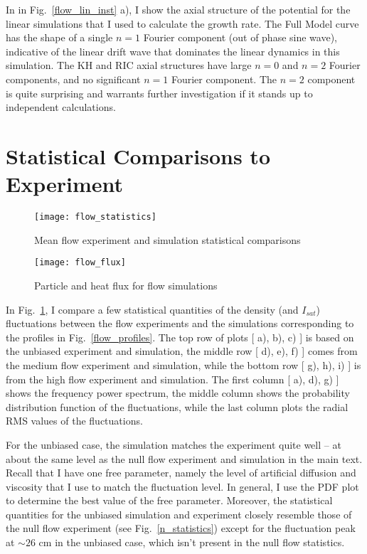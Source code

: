 In in Fig.~\ref{flow_lin_inst} a), I show the axial structure of the potential for the linear simulations that I used to calculate the growth rate. The Full Model curve has the shape of 
a single $n=1$ Fourier component (out of phase sine wave), indicative of the linear drift wave that dominates the linear dynamics in this simulation. The KH and RIC axial structures
have large $n=0$ and $n=2$ Fourier components, and no significant $n=1$ Fourier component. The $n=2$ component is quite surprising and warrants further investigation if it stands up to
independent calculations.

\section{Statistical Comparisons to Experiment}
\label{s_flow_stats}

\begin{figure}
\centerline{\texttt{[image: flow\_statistics]}}
\caption{Mean flow experiment and simulation statistical comparisons}
\label{flow_statistics}
\end{figure}

\begin{figure}
\centerline{\texttt{[image: flow\_flux]}}
\caption{Particle and heat flux for flow simulations}
\label{flow_flux}
\end{figure}

In Fig.~\ref{flow_statistics}, I compare a few statistical quantities of the density (and $I_{sat}$) fluctuations
between the flow experiments and the simulations corresponding to the profiles in Fig.~\ref{flow_profiles}. The top row
of plots [ a), b), c) ] is based on the unbiased experiment and simulation, the middle row [ d), e), f) ] comes from the medium flow experiment and simulation, 
while the bottom row [ g), h), i) ] is from the high flow experiment and simulation. The first column [ a), d), g) ] shows the frequency power spectrum, the middle column shows the probability
distribution function of the fluctuations, while the last column plots the radial RMS values of the fluctuations.

For the unbiased case, the simulation matches the experiment quite well -- at about the same level as the null flow experiment and simulation in the main text. Recall that I have one free parameter,
namely the level of artificial diffusion and viscosity that I use to match the fluctuation level. In general, I use the PDF plot to determine the best value of the free parameter. Moreover,
the statistical quantities for the unbiased simulation and experiment closely resemble those of the null flow experiment (see Fig.~\ref{n_statistics}) except for the fluctuation peak at $\sim 26$ cm
in the unbiased case, which isn't present in the null flow statistics.

